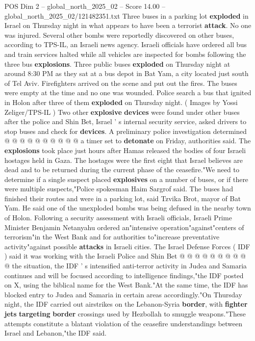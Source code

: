 \begin{textsample}{POS Dim 2 – global\_north\_2025\_02 – Score 14.00 – global\_north\_2025\_02/121482351.txt}  \label{ex:f2_pos_433}
Three buses in a parking lot \textbf{exploded} in Israel on Thursday night in what appears to have been a terrorist \textbf{attack}.
No one was injured.
Several other bombs were reportedly discovered on other buses, according to TPS-IL, an Israeli news agency.
Israeli officials have ordered all bus and train services halted while all vehicles are inspected for bombs following the three bus \textbf{explosions}.
Three public buses \textbf{exploded} on Thursday night at around 8:30 PM as they sat at a bus depot in Bat Yam, a city located just south of Tel Aviv.
Firefighters arrived on the scene and put out the fires.
The buses were empty at the time and no one was wounded.
Police search a bus that ignited in Holon after three of them \textbf{exploded} on Thursday night. ( Images by Yossi Zeliger/TPS-IL ) Two other \textbf{explosive} \textbf{devices} were found under other buses after the police and Shin Bet, Israel ' s internal security service, asked drivers to stop buses and check for \textbf{devices}.
A preliminary police investigation determined @ @ @ @ @ @ @ @ @ @ a timer set to \textbf{detonate} on Friday, authorities said.
The \textbf{explosions} took place just hours after Hamas released the bodies of four Israeli hostages held in Gaza.
The hostages were the first eight that Israel believes are dead and to be returned during the current phase of the ceasefire."We need to determine if a single suspect placed \textbf{explosives} on a number of buses, or if there were multiple suspects,"Police spokesman Haim Sargrof said.
The buses had finished their routes and were in a parking lot, said Tzvika Brot, mayor of Bat Yam.
He said one of the unexploded bombs was being defused in the nearby town of Holon.
Following a security assessment with Israeli officials, Israeli Prime Minister Benjamin Netanyahu ordered an"intensive operation"against"centers of terrorism"in the West Bank and for authorities to"increase preventative activity"against possible \textbf{attacks} in Israeli cities.
The Israel Defense Forces ( IDF ) said it was working with the Israeli Police and Shin Bet @ @ @ @ @ @ @ @ @ @ the situation, the IDF ' s intensified anti-terror activity in Judea and Samaria continues and will be focused according to intelligence findings,"the IDF posted on X, using the biblical name for the West Bank."At the same time, the IDF has blocked entry to Judea and Samaria in certain areas accordingly."On Thursday night, the IDF carried out airstrikes on the Lebanon-Syria \textbf{border}, with \textbf{fighter} \textbf{jets} \textbf{targeting} \textbf{border} crossings used by Hezbollah to smuggle weapons."These attempts constitute a blatant violation of the ceasefire understandings between Israel and Lebanon,"the IDF said.

\end{textsample}
